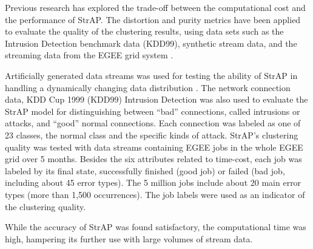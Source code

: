Previous research has explored the trade-off between the computational cost and the performance of StrAP. The distortion and purity metrics have been applied to evaluate the quality of the clustering results, using data sets such as the Intrusion Detection benchmark data (KDD99), synthetic stream data, and the streaming data from the EGEE grid system \cite{zhang2008data}.  

Artificially generated data streams was used for testing the ability of StrAP in handling a dynamically changing data distribution \cite{zhang2008data}. The network connection data, KDD Cup 1999 (KDD99) Intrusion Detection was also used to evaluate the StrAP model for distinguishing between “bad” connections, called intrusions or attacks, and “good” normal connections. Each connection was labeled as one of 23 classes, the normal class and the specific kinds of attack. StrAP's clustering quality was tested with data streams containing EGEE jobs in the whole EGEE grid over 5 months. Besides the six attributes related to time-cost, each job was labeled by its final state, successfully finished (good job) or failed (bad job, including about 45 error types). The 5 million jobs include about 20 main error types (more than 1,500 occurrences). The job labels were used as an indicator of the clustering quality.

While the accuracy of StrAP was found satisfactory, the computational time was high, hampering its further use with large volumes of stream data.






